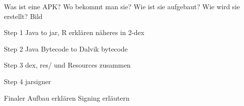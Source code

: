 Was ist eine APK?
Wo bekommt man sie?
Wie ist sie aufgebaut?
Wie wird sie erstellt? Bild

Step 1
Java to jar, R erklären
näheres in 2-dex

Step 2
Java Bytecode to Dalvik bytecode

Step 3
dex, res/ und Resources zusammen

Step 4
jarsigner

Finaler Aufbau erklären
Signing erläutern
